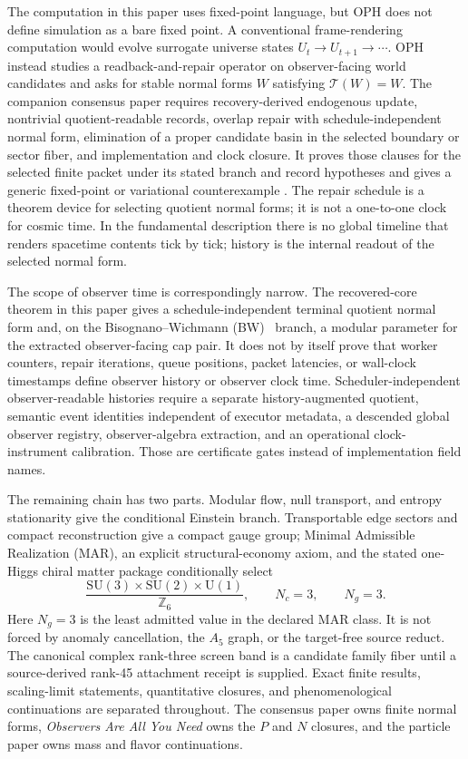 \documentclass[11pt]{article}
\newcommand{\SU}{\mathrm{SU}}
\newcommand{\U}{\mathrm{U}}
\begin{document}
The computation in this paper uses fixed-point language, but OPH does not define simulation as a
bare fixed point. A conventional frame-rendering computation would evolve surrogate universe states
\(U_t\to U_{t+1}\to\cdots\). OPH instead studies a readback-and-repair operator on
observer-facing world candidates and asks for stable normal forms \(W\) satisfying
\(\mathcal T(W)=W\). The companion consensus paper requires recovery-derived endogenous update,
nontrivial quotient-readable records, overlap repair with schedule-independent normal form,
elimination of a proper candidate basin in the selected boundary or sector fiber, and implementation
and clock closure. It proves those clauses for the selected finite packet under its stated branch
and record hypotheses and gives a generic fixed-point or variational counterexample
\cite{ophconsensus}. The repair schedule is a theorem device for selecting quotient normal forms;
it is not a one-to-one clock for cosmic time. In the fundamental description there is no global
timeline that renders spacetime contents tick by tick; history is the internal readout of the
selected normal form.

The scope of observer time is correspondingly narrow. The recovered-core theorem in this paper gives a
schedule-independent terminal quotient normal form and, on the
Bisognano--Wichmann (BW)~\cite{bw75,bw76} branch, a modular parameter for
the extracted observer-facing cap pair. It does not by itself prove that worker counters, repair
iterations, queue positions, packet latencies, or wall-clock timestamps define observer history or
observer clock time. Scheduler-independent observer-readable histories require a separate
history-augmented quotient, semantic event identities independent of executor metadata, a descended
global observer registry, observer-algebra extraction, and an operational clock-instrument
calibration. Those are certificate gates instead of implementation field names.

The remaining chain has two parts. Modular flow, null transport, and entropy
stationarity give the conditional Einstein branch. Transportable edge sectors
and compact reconstruction give a compact gauge group; Minimal Admissible
Realization (MAR), an explicit structural-economy axiom, and the stated
one-Higgs chiral matter package conditionally select
\[
\frac{\SU(3)\times\SU(2)\times\U(1)}{\mathbb Z_6},
\qquad N_c=3,\qquad N_g=3.
\]
Here \(N_g=3\) is the least admitted value in the declared MAR class. It is not
forced by anomaly cancellation, the \(A_5\) graph, or the target-free source
reduct. The canonical complex rank-three screen band is a candidate family
fiber until a source-derived rank-45 attachment receipt is supplied. Exact
finite results, scaling-limit statements, quantitative closures, and
phenomenological continuations are separated throughout. The consensus paper
owns finite normal forms, \emph{Observers Are All You Need} owns the \(P\) and
\(N\) closures, and the particle paper owns mass and flavor continuations.
\end{document}
